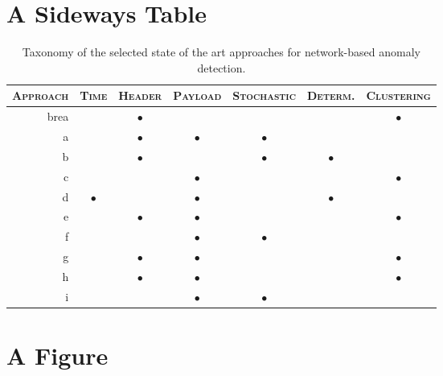 

\section{A Sideways Table}

\clearpage
\begin{table}
\renewcommand{\arraystretch}{1.5} \centering
\begin{tabular}{rcccccc}
\toprule \textsc{Approach} & \textsc{Time} & \textsc{Header} &
\textsc{Payload} & \textsc{Stochastic} & \textsc{Determ.} & \textsc{Clustering}\\
\midrule brea & & $\bullet$ & & & & $\bullet$ \\
a & & $\bullet$ & $\bullet$ & $\bullet$ & & \\
b & & $\bullet$ & & $\bullet$ & $\bullet$ & \\
c & & & $\bullet$ & & & $\bullet$ \\
d & $\bullet$ & & $\bullet$ & & $\bullet$ & \\
e & & $\bullet$ & $\bullet$ & & & $\bullet$ \\
f & & & $\bullet$ & $\bullet$ & & \\
g & & $\bullet$ & $\bullet$ & & & $\bullet$ \\
h & & $\bullet$ & $\bullet$ & & & $\bullet$ \\
i & & & $\bullet$ & $\bullet$ & & \\
\bottomrule
\end{tabular}
\caption{Taxonomy of the selected state of the art approaches for network-based anomaly detection.}
\label{tab:network-sota-taxonomy}
\end{table}
\clearpage


\section{A Figure}


